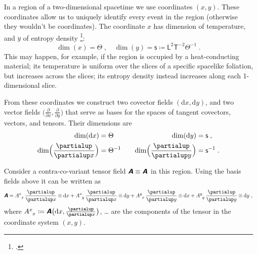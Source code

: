 \documentclass[\ifafour a4paper,12pt,\else a5paper,10pt,\fi%
onecolumn,oneside,article,%
british%
]{memoir}
\makeatletter
\theoremstyle{remark}
\theoremstyle{innote}
\newcommand*{\mathte}[1]{\textbf{\textit{\textsf{#1}}}}
\newcommand*{\citep}{\footcites}
\newcommand*{\de}{\partialup}%
\newcommand*{\di}{\mathrm{d}}%
\newcommand*{\defd}{\coloneqq}
\renewcommand*{\|}[1][]{\nonscript\,#1\vert\nonscript\;\mathopen{}}
\newcommand*{\eg}{{e.g.}}
\newcommand*{\q}{}%
\DeclareRobustCommand*{\q}{%
  \mathbin{\mathpalette\bigcdot@{}}%
}
\newcommand*{\bigcdot@scalefactor}{0.75}
\newcommand*{\bigcdot@widthfactor}{1.5}
\newcommand*{\bigcdot@}[2]{%
  \sbox0{$#1\vcenter{}$}%
  \sbox2{$#1\cdot\m@th$}%
  \hbox to \bigcdot@widthfactor\wd2{%
    \hfil
    \raise\ht0\hbox{%
      \scalebox{\bigcdot@scalefactor}{%
        \lower\ht0\hbox{$#1\bullet\m@th$}%
      }%
    }%
    \hfil
  }%
}
\newcommand*{\Le}{\textsf{L}}
\newcommand*{\Ti}{\textsf{T}}
\newcommand*{\Te}{\Theta}
\newcommand*{\Ent}{\textsf{s}}
\newcommand*{\yA}{\mathte{A}}
\renewcommand*{\i}{\indices}
\newcommand*{\dex}[1][i]{\frac{\de}{\de x^{#1}}}
\newcommand*{\dix}[1][i]{\di x^{#1}}
\makeatother
\begin{document}
In a region of a two-dimensional spacetime we use coordinates $(x,y)$.
These coordinates allow us to uniquely identify every event in the region
(otherwise they wouldn't be coordinates). The coordinate $x$ has dimension
of temperature, and $y$ of entropy density \citep[for general-relativintic
thermomechanics see
\eg][]{eckart1940c,maugin1974b,maugin1978b,maugin1978c,maugin1978d,maugin1978e,muschiketal2014}:
\begin{equation}
  \label{eq:example_coords2d}
  \dim(x)=\Te \;,\quad
  \dim(y)= \Ent \defd \Le^{2}\Ti^{-2}\Te^{-1} \;.
\end{equation}
This may happen, for example, if the region is occupied by a
heat-conducting material; its temperature is uniform over the slices of a
specific spacelike foliation, but increases across the slices; its entropy
density instead increases along each 1-dimensional slice.

From these coordinates we construct two covector fields $(\di x, \di y)$,
and two vector fields $\bigl(\frac{\de}{\de x}, \frac{\de}{\de y}\bigr)$
that serve as bases for the spaces of tangent covectors, vectors, and
tensors. Their dimensions are
\begin{equation}
  \label{eq:example_basisvects2d}
  \begin{aligned}
  \dim(\di x)&=\Te &\quad
                        \dim(\di y)&= \Ent \;,
                                     \\
  \dim\Bigl(\frac{\de}{\de x}\Bigr)&=\Te^{-1} &\quad
                        \dim\Bigl(\frac{\de}{\de y}\Bigr)&= \Ent^{-1} \;.
  \end{aligned}
\end{equation}


Consider a contra-co-variant tensor field $\yA \equiv \yA\i{^{\q}_{\q}}$ in
this region. Using the basis fields above it can be written as
\begin{equation}
  \label{eq:expansion_tensor_2d}
  \yA = %
  A\i{^{x}_{x}}\,\frac{\de}{\de x} \otimes\di x + 
  A\i{^{x}_{y}}\,\frac{\de}{\de x} \otimes\di y + 
  A\i{^{y}_{x}}\,\frac{\de}{\de y} \otimes\di x + 
  A\i{^{y}_{y}}\,\frac{\de}{\de y} \otimes\di y \;,
\end{equation}
where $A\i{^{x}_{x}} \defd \yA\bigl(\di x, \frac{\de}{\de x}\bigr)$, \ldots
are the components of the tensor in the coordinate system $(x, y)$.
\end{document}
